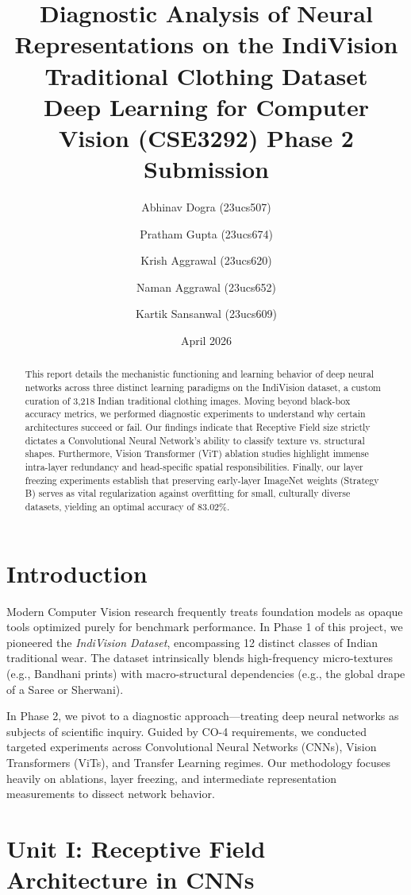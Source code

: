 \documentclass[12pt]{article}
\title{\LARGE\textbf{Diagnostic Analysis of Neural Representations on the IndiVision Traditional Clothing Dataset}\\
\vspace{0.3cm}
\large Deep Learning for Computer Vision (CSE3292) Phase 2 Submission}
\author{Abhinav Dogra (23ucs507)}
\author{Pratham Gupta (23ucs674)}
\author{Krish Aggrawal (23ucs620)}
\author{Naman Aggrawal (23ucs652)}
\author{Kartik Sansanwal (23ucs609)}
\affil{Indian Institute of Information Technology, Una}
\date{April 2026}
\begin{document}
\maketitle

\begin{abstract}
\noindent This report details the mechanistic functioning and learning behavior of deep neural networks across three distinct learning paradigms on the IndiVision dataset, a custom curation of 3,218 Indian traditional clothing images. Moving beyond black-box accuracy metrics, we performed diagnostic experiments to understand why certain architectures succeed or fail. Our findings indicate that Receptive Field size strictly dictates a Convolutional Neural Network's ability to classify texture vs. structural shapes. Furthermore, Vision Transformer (ViT) ablation studies highlight immense intra-layer redundancy and head-specific spatial responsibilities. Finally, our layer freezing experiments establish that preserving early-layer ImageNet weights (Strategy B) serves as vital regularization against overfitting for small, culturally diverse datasets, yielding an optimal accuracy of 83.02\%.
\end{abstract}

\newpage %

\section{Introduction}
Modern Computer Vision research frequently treats foundation models as opaque tools optimized purely for benchmark performance. In Phase 1 of this project, we pioneered the \textit{IndiVision Dataset}, encompassing 12 distinct classes of Indian traditional wear. The dataset intrinsically blends high-frequency micro-textures (e.g., Bandhani prints) with macro-structural dependencies (e.g., the global drape of a Saree or Sherwani). 

In Phase 2, we pivot to a diagnostic approach—treating deep neural networks as subjects of scientific inquiry. Guided by CO-4 requirements, we conducted targeted experiments across Convolutional Neural Networks (CNNs), Vision Transformers (ViTs), and Transfer Learning regimes. Our methodology focuses heavily on ablations, layer freezing, and intermediate representation measurements to dissect network behavior.

\section{Unit I: Receptive Field Architecture in CNNs}
\end{document}
